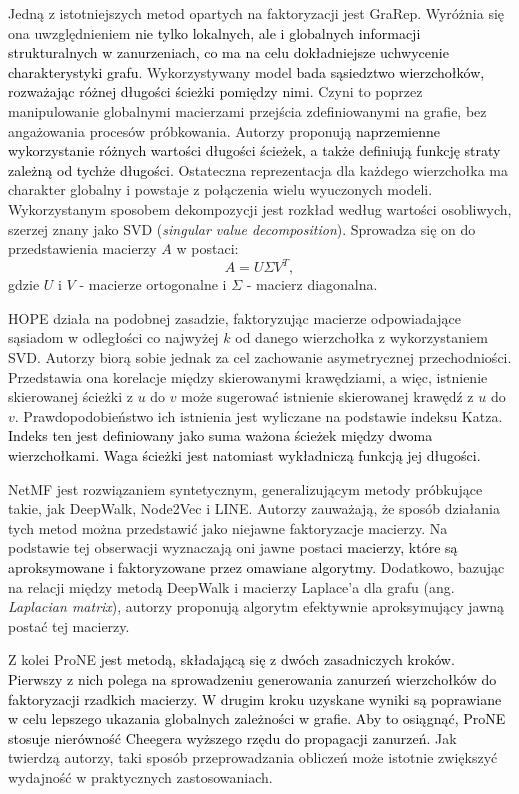         Jedną z istotniejszych metod opartych na faktoryzacji jest GraRep\cite{Cao_Lu_Xu_2015}. Wyróżnia się ona uwzględnieniem \textcolor{black}{nie tylko lokalnych, ale i globalnych informacji strukturalnych w zanurzeniach, co ma na celu dokładniejsze uchwycenie charakterystyki grafu}. Wykorzystywany model \textcolor{black}{bada sąsiedztwo wierzchołków, rozważając różnej długości ścieżki pomiędzy nimi}. Czyni to poprzez manipulowanie globalnymi macierzami przejścia zdefiniowanymi na grafie, bez angażowania procesów próbkowania. Autorzy proponują \textcolor{black}{naprzemienne wykorzystanie różnych wartości długości ścieżek, a także definiują funkcję straty zależną od tychże długości}. Ostateczna reprezentacja dla każdego wierzchołka ma charakter globalny i powstaje z połączenia wielu wyuczonych modeli. Wykorzystanym sposobem dekompozycji jest rozkład według wartości osobliwych, szerzej znany jako SVD (\textit{singular value decomposition}). Sprowadza się on do przedstawienia macierzy $A$ w postaci: 
        \[
            A = U \Sigma V^T,
        \]
        gdzie $U$ i $V$ - macierze ortogonalne i $\Sigma$ - macierz diagonalna.
         
        HOPE\cite{Ou_Cui_Pei_Zhang_Zhu_2016} działa na podobnej zasadzie, faktoryzując macierze odpowiadające sąsiadom w odległości co najwyżej $k$ od danego wierzchołka z wykorzystaniem SVD. Autorzy biorą sobie jednak za cel zachowanie asymetrycznej przechodniości. Przedstawia ona korelacje między skierowanymi krawędziami, a więc, istnienie skierowanej ścieżki z $u$ do $v$ może sugerować istnienie skierowanej krawędź z $u$ do $v$.  Prawdopodobieństwo ich istnienia jest wyliczane na podstawie indeksu Katza\cite{Katz_1953}. \textcolor{black}{Indeks ten jest definiowany jako suma ważona ścieżek między dwoma wierzchołkami. Waga ścieżki jest natomiast wykładniczą funkcją jej długości.} 
        
        NetMF\cite{Qiu_Dong_Ma_Li_Wang_Tang_2018} jest rozwiązaniem syntetycznym, generalizującym  metody próbkujące takie, jak DeepWalk, Node2Vec i LINE. Autorzy zauważają, że sposób działania tych metod można przedstawić jako niejawne faktoryzacje macierzy. Na podstawie tej obserwacji wyznaczają oni jawne postaci \textcolor{black}{macierzy, które są aproksymowane i faktoryzowane przez omawiane algorytmy}. Dodatkowo, bazując na relacji między metodą DeepWalk i macierzy Laplace'a dla grafu (ang. \textit{Laplacian matrix}), autorzy proponują algorytm efektywnie aproksymujący jawną postać tej macierzy.
        
        Z kolei ProNE\cite{Zhang_Dong_Wang_Tang_Ding_2019} \textcolor{black}{jest metodą, składającą się z dwóch zasadniczych kroków. Pierwszy z nich polega na sprowadzeniu generowania zanurzeń wierzchołków do faktoryzacji rzadkich macierzy. W drugim kroku uzyskane wyniki są poprawiane w celu lepszego ukazania globalnych zależności w grafie. Aby to osiągnąć, ProNE stosuje nierówność Cheegera wyższego rzędu\cite{Lee_Gharan_Trevisan_2014} do propagacji zanurzeń.} Jak twierdzą autorzy, taki sposób przeprowadzania obliczeń może istotnie zwiększyć wydajność w praktycznych zastosowaniach.

